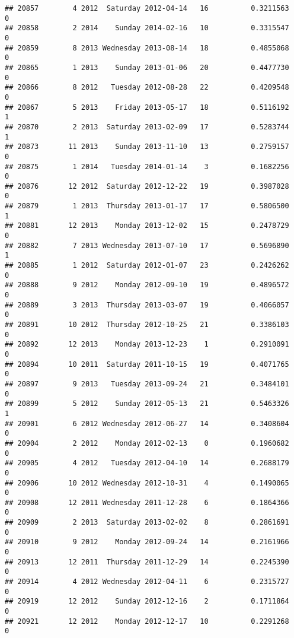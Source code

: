 \documentclass[
]{article}
\begin{document}
\begin{verbatim}
## 20857        4 2012  Saturday 2012-04-14   16          0.3211563             0
## 20858        2 2014    Sunday 2014-02-16   10          0.3315547             0
## 20859        8 2013 Wednesday 2013-08-14   18          0.4855068             0
## 20865        1 2013    Sunday 2013-01-06   20          0.4477730             0
## 20866        8 2012   Tuesday 2012-08-28   22          0.4209548             0
## 20867        5 2013    Friday 2013-05-17   18          0.5116192             1
## 20870        2 2013  Saturday 2013-02-09   17          0.5283744             1
## 20873       11 2013    Sunday 2013-11-10   13          0.2759157             0
## 20875        1 2014   Tuesday 2014-01-14    3          0.1682256             0
## 20876       12 2012  Saturday 2012-12-22   19          0.3987028             0
## 20879        1 2013  Thursday 2013-01-17   17          0.5806500             1
## 20881       12 2013    Monday 2013-12-02   15          0.2478729             0
## 20882        7 2013 Wednesday 2013-07-10   17          0.5696890             1
## 20885        1 2012  Saturday 2012-01-07   23          0.2426262             0
## 20888        9 2012    Monday 2012-09-10   19          0.4896572             0
## 20889        3 2013  Thursday 2013-03-07   19          0.4066057             0
## 20891       10 2012  Thursday 2012-10-25   21          0.3386103             0
## 20892       12 2013    Monday 2013-12-23    1          0.2910091             0
## 20894       10 2011  Saturday 2011-10-15   19          0.4071765             0
## 20897        9 2013   Tuesday 2013-09-24   21          0.3484101             0
## 20899        5 2012    Sunday 2012-05-13   21          0.5463326             1
## 20901        6 2012 Wednesday 2012-06-27   14          0.3408604             0
## 20904        2 2012    Monday 2012-02-13    0          0.1960682             0
## 20905        4 2012   Tuesday 2012-04-10   14          0.2688179             0
## 20906       10 2012 Wednesday 2012-10-31    4          0.1490065             0
## 20908       12 2011 Wednesday 2011-12-28    6          0.1864366             0
## 20909        2 2013  Saturday 2013-02-02    8          0.2861691             0
## 20910        9 2012    Monday 2012-09-24   14          0.2161966             0
## 20913       12 2011  Thursday 2011-12-29   14          0.2245390             0
## 20914        4 2012 Wednesday 2012-04-11    6          0.2315727             0
## 20919       12 2012    Sunday 2012-12-16    2          0.1711864             0
## 20921       12 2012    Monday 2012-12-17   10          0.2291268             0

\end{verbatim}
\end{document}
